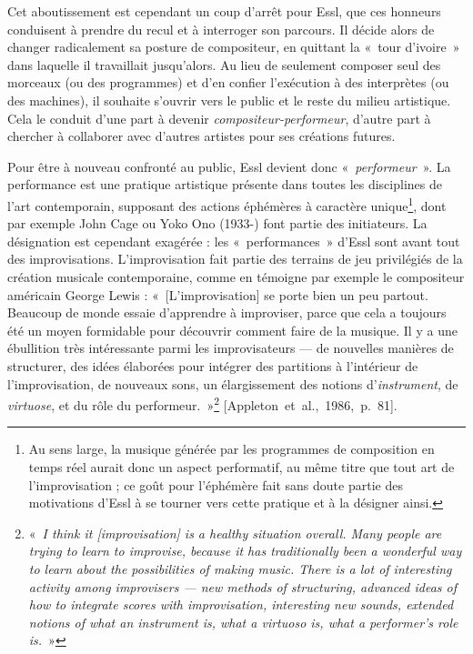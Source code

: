 \documentclass[a4paper,12pt]{article}
\newcommand{\guill}[1]{«~#1~»}
\newcommand{\cicite}[1]{{\footnotesize[#1]}}
\begin{document}
Cet aboutissement est cependant un coup d'arrêt pour Essl, que ces honneurs conduisent à prendre du recul et à interroger son parcours. Il décide alors de changer radicalement sa posture de compositeur, en quittant la \guill{tour d'ivoire} dans laquelle il travaillait jusqu'alors. Au lieu de seulement composer seul des morceaux (ou des programmes) et d'en confier l'exécution à des interprètes (ou des machines), il souhaite s'ouvrir vers le public et le reste du milieu artistique. Cela le conduit d'une part à devenir \emph{compositeur-performeur}, d'autre part à chercher à collaborer avec d'autres artistes pour ses créations futures.

Pour être à nouveau confronté au public, Essl devient donc \guill{\emph{performeur}}. La performance est une pratique artistique présente dans toutes les disciplines de l'art contemporain, supposant des actions éphémères à caractère unique\footnote{Au sens large, la musique générée par les programmes de composition en temps réel aurait donc un aspect performatif, au même titre que tout art de l'improvisation ; ce goût pour l'éphémère fait sans doute partie des motivations d'Essl à se tourner vers cette pratique et à la désigner ainsi.}, dont par exemple John Cage ou Yoko Ono (1933-) font partie des initiateurs. La désignation est cependant exagérée : les \guill{performances} d'Essl sont avant tout des improvisations. L'improvisation fait partie des terrains de jeu privilégiés de la création musicale contemporaine, comme en témoigne par exemple le compositeur américain George Lewis : \guill{[L'improvisation] se porte bien un peu partout. Beaucoup de monde essaie d'apprendre à improviser, parce que cela a toujours été un moyen formidable pour découvrir comment faire de la musique. Il y a une ébullition très intéressante parmi les improvisateurs --- de nouvelles manières de structurer, des idées élaborées pour intégrer des partitions à l'intérieur de l'improvisation, de nouveaux sons, un élargissement des notions d'\emph{instrument}, de \emph{virtuose}, et du rôle du performeur.}\footnote{\guill{\emph{I think it [improvisation] is a healthy situation overall. Many people are trying to learn to improvise, because it has traditionally been a wonderful way to learn about the possibilities of making music. There is a lot of interesting activity among improvisers --- new methods of structuring, advanced ideas of how to integrate scores with improvisation, interesting new sounds, extended notions of what an \emph{instrument} is, what a \emph{virtuoso} is, what a performer's role is.}}} \cicite{Appleton~et~al.,~1986,~p.~81}.
\end{document}
